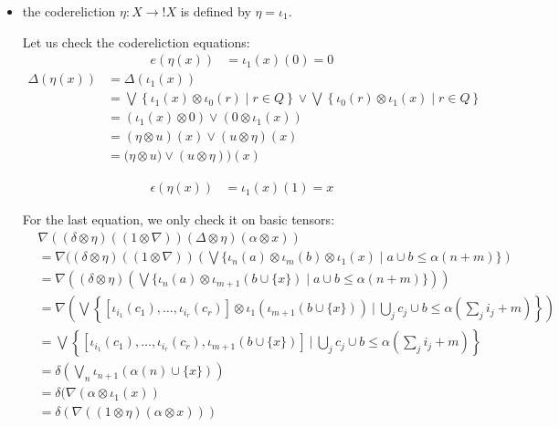 \begin{itemize}
\item the codereliction $\eta: X\to !X$ is defined by 
$\eta= \iota_{1}$.

Let us check the codereliction equations:
\begin{align*}
e(\eta(x)) & = \iota_{1}(x)(0)=0
\end{align*}
\begin{align*}
\Delta(\eta(x)) & = \Delta(\iota_{1}(x)) \\
&=
\bigvee\left\{\iota_{1}(x)\otimes \iota_{0}(r) \mid r\in Q\right\}\vee
\bigvee\left\{\iota_{0}(r)\otimes \iota_{1}(x) \mid r\in Q\right\}
\\
&=
(\iota_{1}(x)\otimes 0 )\vee
(0\otimes \iota_{1}(x) )
\\
&=
(\eta\otimes u)(x)\vee(u\otimes \eta) (x) \\
&=
\Big(\eta\otimes u)\vee(u\otimes \eta)\Big) (x) 
\end{align*}

\begin{align*}
\epsilon(\eta(x))&= \iota_{1}(x)(1) =x
\end{align*}

For the last equation, we only check it on basic tensors:
{\small
\begin{align*}
& \nabla((\delta\otimes \eta)((1\otimes \nabla))(\Delta\otimes \eta)(\alpha\otimes x)) \\
&=\nabla((\delta\otimes \eta)((1\otimes \nabla))\left(
\bigvee
\{\iota_{n}(a)\otimes \iota_{m}(b)\otimes \iota_{1}(x)\mid a\cup b \leq \alpha(n+m)\}
\right)\\ 
&=\nabla\left ((\delta\otimes \eta)\left(
\bigvee
\{\iota_{n}(a)\otimes \iota_{m+1}(b\cup \{x\})\mid a\cup b \leq \alpha(n+m)\}\right)\right)
\\ 
&=\nabla\left (
\bigvee\left 
\{[\iota_{i_{1}}(c_{1}),\dots,\iota_{i_{r}}(c_{r})]
\otimes \iota_{1}( \iota_{m+1}(b\cup \{x\}))\ \Bigg \vert \ 
\bigcup_{j}c_{j}\cup b \leq \alpha\left (\sum_{j}i_{j}+m\right )\right\}\right)
\\ 
&=
\bigvee\left\{
[\iota_{i_{1}}(c_{1}),\dots,\iota_{i_{r}}(c_{r}), \iota_{m+1}(b\cup \{x\})] \ \Bigg \vert \
\bigcup_{j}c_{j}\cup b \leq \alpha\left (\sum_{j}i_{j}+m\right )\right\}
\\
&=
\delta\left(
\bigvee_{n}\iota_{n+1}(
\alpha(n)\cup \{x\})
\right)
\\
&=
\delta(\nabla(\alpha\otimes \iota_{1}(x))
\\
&=
\delta(\nabla((1\otimes \eta)(\alpha\otimes x))) 
\end{align*}
}


\end{itemize}


